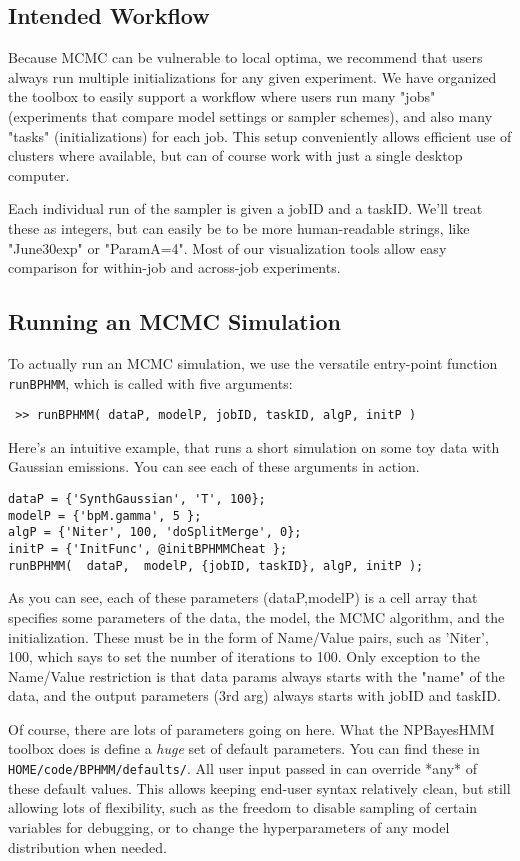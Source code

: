 \documentclass[fontsize=12]{article}
\begin{document}
\subsection{ Intended Workflow }
Because MCMC can be vulnerable to local optima, we recommend that users always run multiple initializations for any given experiment.  We have organized the toolbox to easily support a workflow where users run many "jobs" (experiments that compare model settings or sampler schemes), and also many "tasks" (initializations) for each job.  This setup conveniently allows efficient use of clusters where available, but can of course work with just a single desktop computer.

Each individual run of the sampler is given a jobID and a taskID.  We'll treat these as integers, but can easily be to be more human-readable strings, like "June30exp" or "ParamA=4".  Most of our visualization tools allow easy comparison for within-job and across-job experiments.

\subsection{ Running an MCMC Simulation }
To actually run an MCMC simulation, we use the versatile entry-point function \texttt{runBPHMM}, which is called with five arguments:

\texttt{ >> runBPHMM(  dataP,  modelP, {jobID, taskID}, algP, initP ) }

Here's an intuitive example, that runs a short simulation on some toy data with Gaussian emissions.  You can see each of these arguments in action.

\begin{verbatim}
dataP = {'SynthGaussian', 'T', 100};
modelP = {'bpM.gamma', 5 };
algP = {'Niter', 100, 'doSplitMerge', 0};
initP = {'InitFunc', @initBPHMMCheat };
runBPHMM(  dataP,  modelP, {jobID, taskID}, algP, initP );
\end{verbatim}

As you can see, each of these parameters (dataP,modelP) is a cell array that specifies some parameters of the data, the model, the MCMC algorithm, and the initialization.  These must be in the form of Name/Value pairs, such as {'Niter', 100}, which says to set the number of iterations to 100. Only exception to the Name/Value restriction is that data params always starts with the "name" of the data, and the output parameters (3rd arg) always starts with jobID and taskID.

Of course, there are lots of parameters going on here.  What the NPBayesHMM toolbox does is define a \emph{huge} set of default parameters.  You can find these in \texttt{HOME/code/BPHMM/defaults/}.  All user input passed in can override *any* of these default values.  This allows keeping end-user syntax relatively clean, but still allowing lots of flexibility, such as the freedom to disable sampling of certain variables for debugging, or to change the hyperparameters of any model distribution when needed.
\end{document}
